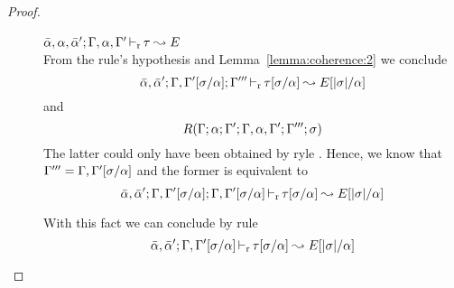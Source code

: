 \begin{proof}
\begin{description}
\item[]\quad$\bar{\alpha},\alpha,\bar{\alpha}';\Gamma,\alpha,\Gamma'
\mathop{\vdash_{\mathrm{r}}} \tau \leadsto E$ \ \\
  From the rule's hypothesis and Lemma~\ref{lemma:coherence:2} we conclude
\begin{equation*}
  \bar{\alpha},\bar{\alpha}'; \Gamma,\Gamma'[\sigma/\alpha];\Gamma''' \mathop{\vdash_{\mathrm{r}}} \tau[\sigma/\alpha] \leadsto E[|\sigma|/\alpha]
\end{equation*}
  and
\begin{equation*}
  R(\Gamma;\alpha;\Gamma';\Gamma,\alpha,\Gamma';\Gamma''';\sigma)
\end{equation*}
  The latter could only have been obtained by ryle . 
  Hence, we know that $\Gamma''' = \Gamma,\Gamma'[\sigma/\alpha]$ and the former is equivalent to
\begin{equation*}
  \bar{\alpha},\bar{\alpha}'; \Gamma,\Gamma'[\sigma/\alpha];\Gamma,\Gamma'[\sigma/\alpha] \mathop{\vdash_{\mathrm{r}}} \tau[\sigma/\alpha] \leadsto E[|\sigma|/\alpha]
\end{equation*}

  With this fact we can conclude by rule 
\begin{equation*}
\bar{\alpha},\bar{\alpha}';\Gamma,\Gamma'[\sigma/\alpha] \mathop{\vdash_{\mathrm{r}}} \tau[\sigma/\alpha] \leadsto E[|\sigma|/\alpha]
\end{equation*}
\end{description}
\end{proof}

